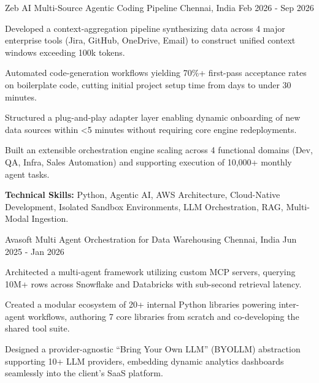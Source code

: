 \begin{cventries}
  \vspace{6mm}
  \cventry
    {Zeb AI} %
    {Multi-Source Agentic Coding Pipeline} %
    {Chennai, India} %
    {Feb 2026 - Sep 2026} %
    {
      \begin{cvitems} %
        \item {Developed a context-aggregation pipeline synthesizing data across 4 major enterprise tools (Jira, GitHub, OneDrive, Email) to construct unified context windows exceeding 100k tokens.}
        \item {Automated code-generation workflows yielding 70\%+ first-pass acceptance rates on boilerplate code, cutting initial project setup time from days to under 30 minutes.}
        \item {Structured a plug-and-play adapter layer enabling dynamic onboarding of new data sources within <5 minutes without requiring core engine redeployments.}
        \item {Built an extensible orchestration engine scaling across 4 functional domains (Dev, QA, Infra, Sales Automation) and supporting execution of 10,000+ monthly agent tasks.}
        \item {\textbf{Technical Skills:} Python, Agentic AI, AWS Architecture, Cloud-Native Development, Isolated Sandbox Environments, LLM Orchestration, RAG, Multi-Modal Ingestion.}
      \end{cvitems}
    }
  \vspace{6mm}
  \cventry
    {Avasoft} %
    {Multi Agent Orchestration for Data Warehousing} %
    {Chennai, India} %
    {Jun 2025 - Jan 2026} %
    {
      \begin{cvitems} %
        \item {Architected a multi-agent framework utilizing custom MCP servers, querying 10M+ rows across Snowflake and Databricks with sub-second retrieval latency.}
        \item {Created a modular ecosystem of 20+ internal Python libraries powering inter-agent workflows, authoring 7 core libraries from scratch and co-developing the shared tool suite.}
        \item {Designed a provider-agnostic ``Bring Your Own LLM'' (BYOLLM) abstraction supporting 10+ LLM providers, embedding dynamic analytics dashboards seamlessly into the client's SaaS platform.}

\end{cvitems}}
\end{cventries}
